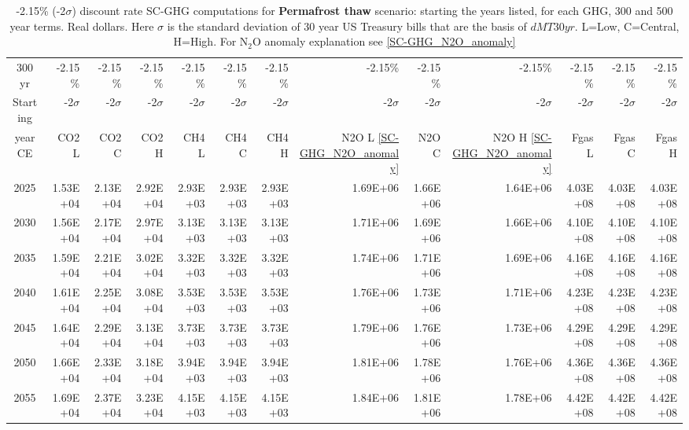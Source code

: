 \documentclass{article}
\begin{document}
\begin{table}
      \caption{-2.15\% (-2$\sigma$) discount rate   SC-GHG computations for \textbf{Permafrost thaw} scenario: starting the years listed, for each GHG, 300 and 500 year terms. Real dollars. Here $\sigma$ is the standard deviation of 30 year US Treasury bills that are the basis of $dMT30yr$. L=Low, C=Central, H=High. For N$_2$O anomaly explanation see \ref{SC-GHG_N2O_anomaly}} 
\label{PVs_300_yearSCC_S2.15}
\small
\begin{tabular}{crrr|rrr|rrr|rrr}
300 yr   & -2.15\%    & -2.15\%    & -2.15\%    & -2.15\%    & -2.15\%    & -2.15\%    & -2.15\%    & -2.15\%    & -2.15\%    & -2.15\%    & -2.15\%    & -2.15\%    \\
Starting & -2$\sigma$ & -2$\sigma$ & -2$\sigma$ & -2$\sigma$ & -2$\sigma$ & -2$\sigma$ & -2$\sigma$ & -2$\sigma$ & -2$\sigma$ & -2$\sigma$ & -2$\sigma$ & -2$\sigma$ \\
year CE  & CO2 L      & CO2 C      & CO2 H      & CH4 L      & CH4 C      & CH4 H      & N2O L \ref{SC-GHG_N2O_anomaly}     & N2O C      & N2O H \ref{SC-GHG_N2O_anomaly}      & Fgas L     & Fgas C     & Fgas H     \\
2025     & 1.53E+04   & 2.13E+04   & 2.92E+04   & 2.93E+03   & 2.93E+03   & 2.93E+03   & 1.69E+06   & 1.66E+06   & 1.64E+06   & 4.03E+08   & 4.03E+08   & 4.03E+08   \\
2030     & 1.56E+04   & 2.17E+04   & 2.97E+04   & 3.13E+03   & 3.13E+03   & 3.13E+03   & 1.71E+06   & 1.69E+06   & 1.66E+06   & 4.10E+08   & 4.10E+08   & 4.10E+08   \\
2035     & 1.59E+04   & 2.21E+04   & 3.02E+04   & 3.32E+03   & 3.32E+03   & 3.32E+03   & 1.74E+06   & 1.71E+06   & 1.69E+06   & 4.16E+08   & 4.16E+08   & 4.16E+08   \\
2040     & 1.61E+04   & 2.25E+04   & 3.08E+04   & 3.53E+03   & 3.53E+03   & 3.53E+03   & 1.76E+06   & 1.73E+06   & 1.71E+06   & 4.23E+08   & 4.23E+08   & 4.23E+08   \\
2045     & 1.64E+04   & 2.29E+04   & 3.13E+04   & 3.73E+03   & 3.73E+03   & 3.73E+03   & 1.79E+06   & 1.76E+06   & 1.73E+06   & 4.29E+08   & 4.29E+08   & 4.29E+08   \\
2050     & 1.66E+04   & 2.33E+04   & 3.18E+04   & 3.94E+03   & 3.94E+03   & 3.94E+03   & 1.81E+06   & 1.78E+06   & 1.76E+06   & 4.36E+08   & 4.36E+08   & 4.36E+08   \\
2055     & 1.69E+04   & 2.37E+04   & 3.23E+04   & 4.15E+03   & 4.15E+03   & 4.15E+03   & 1.84E+06   & 1.81E+06   & 1.78E+06   & 4.42E+08   & 4.42E+08   & 4.42E+08   \\

\end{tabular}
\end{table}
\end{document}
